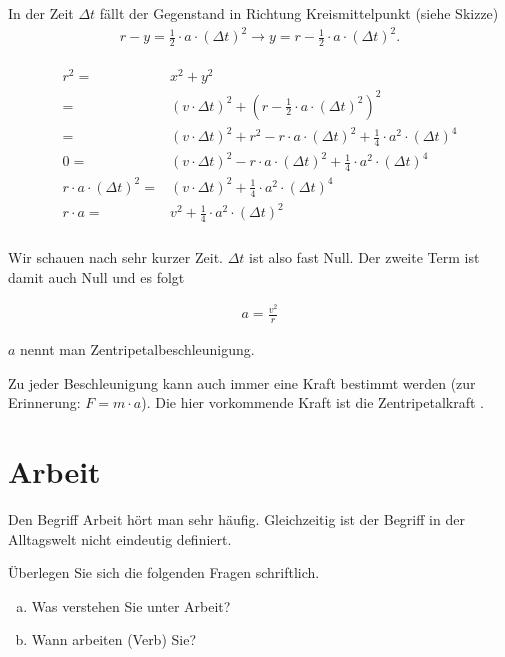 \documentclass[12pt,a4paper,twoside]{article}
\def\dir{./Aufgaben_Mechanik/}
\newcommand{\Einbinden}[1]{}
\begin{document}
In der Zeit $\Delta t$ fällt der Gegenstand in Richtung Kreismittelpunkt (siehe Skizze)
\begin{eqnarray*}
	r-y = \frac{1}{2}\cdot a\cdot (\Delta t)^2 \to y = r - \frac{1}{2}\cdot a\cdot(\Delta t)^2\text{.}
\end{eqnarray*}

\begin{eqnarray*}
	\begin{split}
		r^2 = & x^2 + y^2\\
		    = & (v\cdot \Delta t)^2 + (r-\frac{1}{2}\cdot a\cdot (\Delta t)^2)^2\\
			= & (v\cdot \Delta t)^2 + r^2 - r\cdot a\cdot (\Delta t)^2 + \frac{1}{4}\cdot a^2 \cdot (\Delta t)^4\\
	0		= & (v\cdot \Delta t)^2 - r\cdot a\cdot (\Delta t)^2 + \frac{1}{4}\cdot a^2 \cdot (\Delta t)^4\\
	r\cdot a\cdot (\Delta t)^2		= & (v\cdot \Delta t)^2 + \frac{1}{4}\cdot a^2 \cdot (\Delta t)^4\\
	r\cdot a	= & v^2 + \frac{1}{4}\cdot a^2 \cdot (\Delta t)^2\\
	\end{split}
\end{eqnarray*}

Wir schauen nach sehr kurzer Zeit. $\Delta t$ ist also fast Null. 
Der zweite Term ist damit auch Null und es folgt

\begin{eqnarray*}
	a=\frac{v^2}{r}
\end{eqnarray*}

$a$ nennt man Zentripetalbeschleunigung.

Zu jeder Beschleunigung kann auch immer eine Kraft bestimmt werden (zur Erinnerung: $F=m\cdot a$).
Die hier vorkommende Kraft ist die Zentripetalkraft .


\Einbinden{\dir/kreisbewegung01.tex}
\Einbinden{\dir/kreisbewegung_kanone.tex}
\Einbinden{\dir/kreisbewegung_eimer.tex}
\Einbinden{\dir/kreisbewegung_reibung.tex}

\Einbinden{\dir/hammerwurf.tex}

\newpage


\section*{Arbeit}

\begin{aufgabe}
	Den Begriff Arbeit hört man sehr häufig.
	Gleichzeitig ist der Begriff in der Alltagswelt nicht eindeutig definiert.

Überlegen Sie sich die folgenden Fragen schriftlich.
\begin{enumerate}[a)]
	\item	Was verstehen Sie unter Arbeit?
	\item 	Wann arbeiten (Verb) Sie?
\end{enumerate}

\end{aufgabe}
\end{document}
